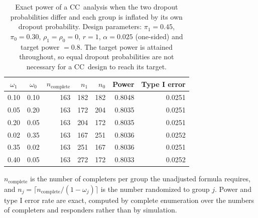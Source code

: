 \begin{table}[htbp]
  \centering
  \caption{Exact power of a CC~analysis when the two dropout probabilities differ and each group is inflated by its own dropout probability. Design parameters: $\pi_{1} = 0.45$, $\pi_{0} = 0.30$, $\rho_{1} = \rho_{0} = 0$, $r = 1$, $\alpha = 0.025$ (one-sided) and target power $= 0.8$. The target power is attained throughout, so equal dropout probabilities are not necessary for a CC~design to reach its target.}
  \label{tab:unequal-dropout}
  \begin{threeparttable}
  \begin{tabular}{ccrrrrr}
    \toprule
    $\omega_{1}$ & $\omega_{0}$ & $n_{\mathrm{complete}}$ & $n_{1}$ & $n_{0}$ & Power & Type I error \\
    \midrule
    0.10 & 0.10 & 163 & 182 & 182 & 0.8048 & 0.0251 \\
    0.05 & 0.20 & 163 & 172 & 204 & 0.8035 & 0.0251 \\
    0.20 & 0.05 & 163 & 204 & 172 & 0.8035 & 0.0251 \\
    0.02 & 0.35 & 163 & 167 & 251 & 0.8036 & 0.0252 \\
    0.35 & 0.02 & 163 & 251 & 167 & 0.8036 & 0.0251 \\
    0.40 & 0.05 & 163 & 272 & 172 & 0.8033 & 0.0252 \\
    \bottomrule
  \end{tabular}
  \begin{tablenotes}[flushleft]\footnotesize
    \item $n_{\mathrm{complete}}$ is the number of completers per group the unadjusted formula requires, and $n_{j} = \lceil n_{\mathrm{complete}} / (1 - \omega_{j}) \rceil$ is the number randomized to group $j$. Power and type I error rate are exact, computed by complete enumeration over the numbers of completers and responders rather than by simulation.
  \end{tablenotes}
  \end{threeparttable}
\end{table}
